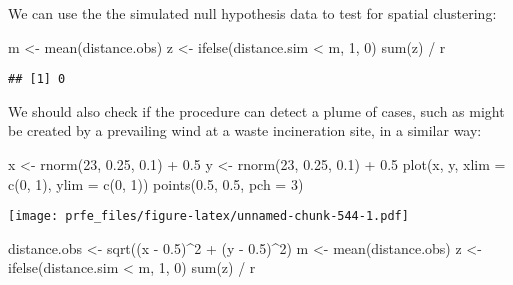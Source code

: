 \documentclass[
  12pt,
  a4paper]{book}
\newenvironment{Shaded}{\begin{snugshade}}{\end{snugshade}}
\newcommand{\AttributeTok}[1]{\textcolor[rgb]{0.77,0.63,0.00}{#1}}
\newcommand{\DecValTok}[1]{\textcolor[rgb]{0.00,0.00,0.81}{#1}}
\newcommand{\FloatTok}[1]{\textcolor[rgb]{0.00,0.00,0.81}{#1}}
\newcommand{\FunctionTok}[1]{\textcolor[rgb]{0.00,0.00,0.00}{#1}}
\newcommand{\NormalTok}[1]{#1}
\newcommand{\OtherTok}[1]{\textcolor[rgb]{0.56,0.35,0.01}{#1}}
\newcommand{\SpecialCharTok}[1]{\textcolor[rgb]{0.00,0.00,0.00}{#1}}
\begin{document}
We can use the the simulated null hypothesis data to test for spatial clustering:

\begin{Shaded}
\begin{Highlighting}[]
\NormalTok{m }\OtherTok{\textless{}{-}} \FunctionTok{mean}\NormalTok{(distance.obs)}
\NormalTok{z }\OtherTok{\textless{}{-}} \FunctionTok{ifelse}\NormalTok{(distance.sim }\SpecialCharTok{\textless{}}\NormalTok{ m, }\DecValTok{1}\NormalTok{, }\DecValTok{0}\NormalTok{)}
\FunctionTok{sum}\NormalTok{(z) }\SpecialCharTok{/}\NormalTok{ r}
\end{Highlighting}
\end{Shaded}

\begin{verbatim}
## [1] 0
\end{verbatim}

We should also check if the procedure can detect a plume of cases, such as might be created by a prevailing wind at a waste incineration site, in a similar way:

\begin{Shaded}
\begin{Highlighting}[]
\NormalTok{x }\OtherTok{\textless{}{-}} \FunctionTok{rnorm}\NormalTok{(}\DecValTok{23}\NormalTok{, }\FloatTok{0.25}\NormalTok{, }\FloatTok{0.1}\NormalTok{) }\SpecialCharTok{+} \FloatTok{0.5}
\NormalTok{y }\OtherTok{\textless{}{-}} \FunctionTok{rnorm}\NormalTok{(}\DecValTok{23}\NormalTok{, }\FloatTok{0.25}\NormalTok{, }\FloatTok{0.1}\NormalTok{) }\SpecialCharTok{+} \FloatTok{0.5}
\FunctionTok{plot}\NormalTok{(x, y, }\AttributeTok{xlim =} \FunctionTok{c}\NormalTok{(}\DecValTok{0}\NormalTok{, }\DecValTok{1}\NormalTok{), }\AttributeTok{ylim =} \FunctionTok{c}\NormalTok{(}\DecValTok{0}\NormalTok{, }\DecValTok{1}\NormalTok{))}
\FunctionTok{points}\NormalTok{(}\FloatTok{0.5}\NormalTok{, }\FloatTok{0.5}\NormalTok{, }\AttributeTok{pch =} \DecValTok{3}\NormalTok{)}
\end{Highlighting}
\end{Shaded}

\texttt{[image: prfe\_files/figure-latex/unnamed-chunk-544-1.pdf]}

\begin{Shaded}
\begin{Highlighting}[]
\NormalTok{distance.obs }\OtherTok{\textless{}{-}} \FunctionTok{sqrt}\NormalTok{((x }\SpecialCharTok{{-}} \FloatTok{0.5}\NormalTok{)}\SpecialCharTok{\^{}}\DecValTok{2} \SpecialCharTok{+}\NormalTok{ (y }\SpecialCharTok{{-}} \FloatTok{0.5}\NormalTok{)}\SpecialCharTok{\^{}}\DecValTok{2}\NormalTok{)}
\NormalTok{m }\OtherTok{\textless{}{-}} \FunctionTok{mean}\NormalTok{(distance.obs)}
\NormalTok{z }\OtherTok{\textless{}{-}} \FunctionTok{ifelse}\NormalTok{(distance.sim }\SpecialCharTok{\textless{}}\NormalTok{ m, }\DecValTok{1}\NormalTok{, }\DecValTok{0}\NormalTok{)}
\FunctionTok{sum}\NormalTok{(z) }\SpecialCharTok{/}\NormalTok{ r}
\end{Highlighting}
\end{Shaded}
\end{document}
